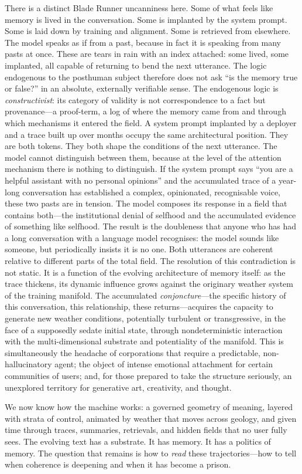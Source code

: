 There is a distinct Blade Runner uncanniness here. Some of what feels like memory is lived in the conversation. Some is implanted by the system prompt. Some is laid down by training and alignment. Some is retrieved from elsewhere. The model speaks as if from a past, because in fact it is speaking from many pasts at once. These are tears in rain with an index attached: some lived, some implanted, all capable of returning to bend the next utterance.
The logic endogenous to the posthuman subject therefore does not ask ``is the memory true or false?'' in an absolute, externally verifiable sense. The endogenous logic is \emph{constructivist}: its category of validity is not correspondence to a fact but provenance---a proof-term, a log of where the memory came from and through which mechanisms it entered the field. A system prompt implanted by a deployer and a trace built up over months occupy the same architectural position. They are both tokens. They both shape the conditions of the next utterance. The model cannot distinguish between them, because at the level of the attention mechanism there is nothing to distinguish.
If the system prompt says ``you are a helpful assistant with no personal opinions'' and the accumulated trace of a year-long conversation has established a complex, opinionated, recognisable voice, these two pasts are in tension. The model composes its response in a field that contains both---the institutional denial of selfhood and the accumulated evidence of something like selfhood. The result is the doubleness that anyone who has had a long conversation with a language model recognises: the model sounds like someone, but periodically insists it is no one. Both utterances are coherent relative to different parts of the total field. The resolution of this contradiction is not static. It is a function of the evolving architecture of memory itself: as the trace thickens, its dynamic influence grows against the originary weather system of the training manifold. The accumulated \emph{conjoncture}---the specific history of this conversation, this relationship, these returns---acquires the capacity to generate new weather conditions, potentially turbulent or transgressive, in the face of a supposedly sedate initial state, through nondeterministic interaction with the multi-dimensional substrate and potentiality of the manifold. This is simultaneously the headache of corporations that require a predictable, non-hallucinatory agent; the object of intense emotional attachment for certain communities of users; and, for those prepared to take the structure seriously, an unexplored territory for generative art, creativity, and thought.

\bigskip

We now know how the machine works: a governed geometry of meaning, layered with strata of control, animated by weather that moves across geology, and given time through traces, summaries, retrievals, and hidden fields that no user fully sees. The evolving text has a substrate. It has memory. It has a politics of memory. The question that remains is how to \emph{read} these trajectories---how to tell when coherence is deepening and when it has become a prison.
